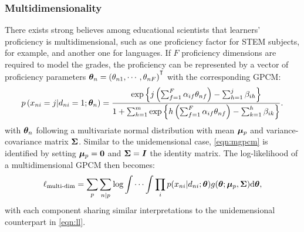 \subsubsection{Multidimensionality}

There exists strong believes among educational scientists that learners' proficiency is multidimensional, such as one proficiency factor for STEM subjects, for example, and another one for languages. If $F$ proficiency dimensions are required to model the grades, the proficiency can be represented by a vector of proficiency parameters $\m{\theta}_n=\left(\theta_{n1}, \cdots, \theta_{nF}\right)\Ts$ with the corresponding GPCM:
\begin{equation}\label{eqn:mgpcm}
    p \left( x_{ni} = j | d_{ni} = 1; \boldsymbol{\theta}_n \right) =
    \frac{ \mathrm{exp}\left\{ j \left( \sum_{f=1}^F \alpha_{if} \theta_{nf} \right) - \sum_{h=1}^j \beta_{ih} \right\} }{ 1 + \sum_{h=1}^m \mathrm{exp}\left\{ h \left( \sum_{f=1}^F \alpha_{if} \theta_{nf} \right) - \sum_{k=1}^h \beta_{ik} \right\} }.
\end{equation}
with $\boldsymbol{\theta}_n$ following a multivariate normal distribution with mean $\boldsymbol{\mu}_p$ and variance-covariance matrix $\boldsymbol{\Sigma}$. Similar to the unidemensional case, \cref{eqn:mgpcm} is identified by setting $\boldsymbol{\mu}_p=\boldsymbol{0}$ and $\boldsymbol{\Sigma} = \boldsymbol{I}$ the identity matrix. The log-likelihood of a multidimensional GPCM then becomes:
\begin{equation}\label{eqn:mll}
    \ell_\text{multi-dim} = \sum_{p} \sum_{n | p} \log \int \cdots \int \prod_i p( x_{ni} | d_{ni}; \boldsymbol{\theta} ) g( \boldsymbol{\theta}; \boldsymbol{\mu}_p, \boldsymbol{\Sigma} ) \mathrm{d} \boldsymbol{\theta},
\end{equation}
with each component sharing similar interpretations to the unidemensional counterpart in \cref{eqn:ll}.